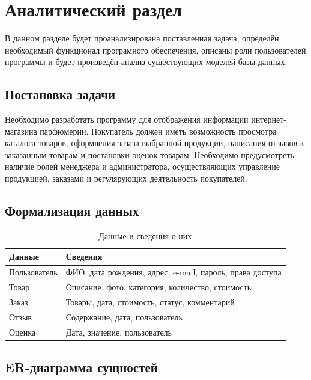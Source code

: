 \chapter{Аналитический раздел}
В данном разделе будет проанализирована поставленная задача, определён необходимый функционал програмного обеспечения, описаны роли пользователей программы и будет произведён анализ существующих моделей базы данных.

\section{Постановка задачи}
Необходимо разработать программу для отображения информации интернет-магазина парфюмерии. Покупатель должен иметь возможность просмотра каталога товаров, оформления зазаза выбранной продукции, написания отзывов к заказанным товарам и постановки оценок товарам. Необходимо предусмотреть наличие ролей менеджера и администратора, осуществляющих управление продукцией, заказами и регулярующих деятельность покупателей.
\section{Формализация данных}

\begin{table}[h!]
	\begin{center}
		\caption{Данные и сведения о них}
		\begin{tabular}{ |p{5cm}|p{11cm}| }
			\hline
			\textbf{Данные} & \textbf{Сведения}\\ \hline
			Пользователь &  ФИО, дата рождения, адрес, e-mail, пароль, права доступа\\ \hline
			Товар &  Описание, фото, категория, количество, стоимость\\ \hline
			Заказ &  Товары, дата, стоимость, статус, комментарий\\ \hline
			Отзыв &  Содержание, дата, пользователь\\ \hline
			Оценка &  Дата, значение, пользователь\\ \hline
		\end{tabular}
		\label{data-table}
	\end{center}
\end{table}		

\newpage

\section{ER-диаграмма сущностей}

